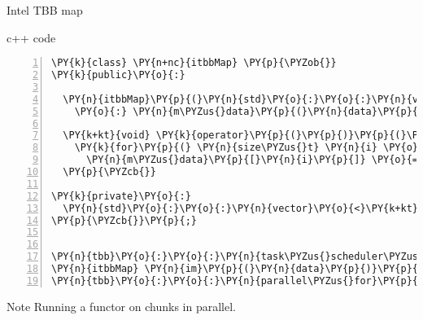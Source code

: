 \documentclass{beamer}
\begin{document}
\begin{frame}[fragile]{Intel TBB map}

\begin{block}{c++ code}

\tiny
\begin{Verbatim}[commandchars=\\\{\},numbers=left,firstnumber=1,stepnumber=1]
\PY{k}{class} \PY{n+nc}{itbbMap} \PY{p}{\PYZob{}}
\PY{k}{public}\PY{o}{:}

  \PY{n}{itbbMap}\PY{p}{(}\PY{n}{std}\PY{o}{:}\PY{o}{:}\PY{n}{vector}\PY{o}{<}\PY{k+kt}{float}\PY{o}{>}\PY{o}{&} \PY{n}{data}\PY{p}{)}
    \PY{o}{:} \PY{n}{m\PYZus{}data}\PY{p}{(}\PY{n}{data}\PY{p}{)} \PY{p}{\PYZob{}}\PY{p}{\PYZcb{}}

  \PY{k+kt}{void} \PY{k}{operator}\PY{p}{(}\PY{p}{)}\PY{p}{(}\PY{k}{const} \PY{n}{tbb}\PY{o}{:}\PY{o}{:}\PY{n}{blocked\PYZus{}range}\PY{o}{<}\PY{n}{size\PYZus{}t}\PY{o}{>}\PY{o}{&} \PY{n}{r}\PY{p}{)} \PY{k}{const} \PY{p}{\PYZob{}}
    \PY{k}{for}\PY{p}{(} \PY{n}{size\PYZus{}t} \PY{n}{i} \PY{o}{=} \PY{n}{r}\PY{p}{.}\PY{n}{begin}\PY{p}{(}\PY{p}{)}\PY{p}{;} \PY{n}{i} \PY{o}{!}\PY{o}{=} \PY{n}{r}\PY{p}{.}\PY{n}{end}\PY{p}{(}\PY{p}{)}\PY{p}{;} \PY{n}{i}\PY{o}{+}\PY{o}{+} \PY{p}{)}
      \PY{n}{m\PYZus{}data}\PY{p}{[}\PY{n}{i}\PY{p}{]} \PY{o}{=} \PY{n}{modify}\PY{p}{(}\PY{n}{m\PYZus{}data}\PY{p}{[}\PY{n}{i}\PY{p}{]}\PY{p}{)}\PY{p}{;}
  \PY{p}{\PYZcb{}}

\PY{k}{private}\PY{o}{:}
  \PY{n}{std}\PY{o}{:}\PY{o}{:}\PY{n}{vector}\PY{o}{<}\PY{k+kt}{float}\PY{o}{>}\PY{o}{&} \PY{n}{m\PYZus{}data}\PY{p}{;}
\PY{p}{\PYZcb{}}\PY{p}{;}


\PY{n}{tbb}\PY{o}{:}\PY{o}{:}\PY{n}{task\PYZus{}scheduler\PYZus{}init} \PY{n}{init}\PY{p}{(}\PY{n}{NUMBER\PYZus{}OF\PYZus{}THREADS}\PY{p}{)}\PY{p}{;}
\PY{n}{itbbMap} \PY{n}{im}\PY{p}{(}\PY{n}{data}\PY{p}{)}\PY{p}{;}
\PY{n}{tbb}\PY{o}{:}\PY{o}{:}\PY{n}{parallel\PYZus{}for}\PY{p}{(}\PY{n}{tbb}\PY{o}{:}\PY{o}{:}\PY{n}{blocked\PYZus{}range}\PY{o}{<}\PY{n}{size\PYZus{}t}\PY{o}{>}\PY{p}{(}\PY{l+m+mi}{0}\PY{p}{,} \PY{n}{data}\PY{p}{.}\PY{n}{size}\PY{p}{(}\PY{p}{)}\PY{p}{,} \PY{n}{CHUNK\PYZus{}SIZE}\PY{p}{)}\PY{p}{,} \PY{n}{im}\PY{p}{)}\PY{p}{;}
\end{Verbatim}

\end{block}

\begin{exampleblock}{Note}
\small
Running a functor on chunks in parallel.
\end{exampleblock}

\end{frame}
\end{document}
